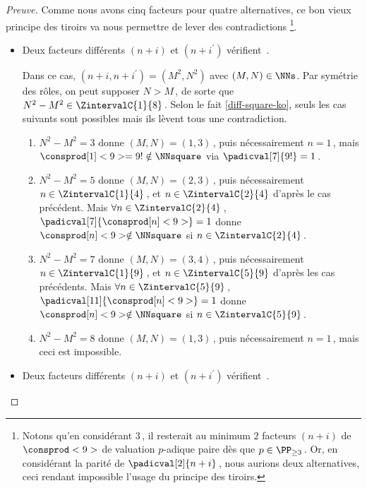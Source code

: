 \begin{proof}[Preuve]
    \medskip
    
    Comme nous avons cinq facteurs pour quatre alternatives, ce bon vieux principe des tiroirs va nous permettre de lever des contradictions
    \footnote{
    	Notons qu'en considérant $3$\,, il resterait au minimum $2$ facteurs $(n + i)$ de $\consprod<9>$ de valuation $p$-adique paire dès que $p \in \PP_{\geq 3}$\,. Or, en considérant la parité de $\padicval[2]{n + i}$\,, nous aurions deux alternatives, ceci rendant impossible l'usage du principe des tiroirs.
    }.
    \begin{itemize}
    	\medskip
		\item Deux facteurs différents $(n+i)$ et $(n+i^\prime)$ vérifient \,.
		
		\smallskip
		\noindent
		Dans ce cas, $(n+i, n+i^\prime) = (M^2, N^2)$ avec $(M, N) \in \NNs$.
		Par symétrie des rôles, on peut supposer $N > M$\,, de sorte que $N^2 - M^2 \in \ZintervalC{1}{8}$\,. 
		Selon le fait \ref{diff-square-ko}, seuls les cas suivants sont possibles mais ils lèvent tous une contradiction.
		\begin{enumerate}
			\item $N^2 - M^2 = 3$ donne $(M, N) = (1, 3)$\,, puis nécessairement $n = 1$\,, mais $\consprod[1]<9> = 9 ! \notin \NNsquare$ via $\padicval[7]{9!} = 1$\,.


			\item $N^2 - M^2 = 5$ donne $(M, N) = (2, 3)$\,, puis nécessairement $n \in \ZintervalC{1}{4}$\,, et $n \in \ZintervalC{2}{4}$ d'après le cas précédent.
			Mais $\forall n \in \ZintervalC{2}{4}$\,, $\padicval[7]{\consprod[n]<9>} = 1$ donne $\consprod[n]<9> \notin \NNsquare$ si $n \in \ZintervalC{2}{4}$\,.
			

			\item $N^2 - M^2 = 7$ donne $(M, N) = (3, 4)$\,, puis nécessairement $n \in \ZintervalC{1}{9}$\,, et $n \in \ZintervalC{5}{9}$ d'après les cas précédents.
			Mais $\forall n \in \ZintervalC{5}{9}$\,, $\padicval[11]{\consprod[n]<9>} = 1$ donne $\consprod[n]<9> \notin \NNsquare$ si $n \in \ZintervalC{5}{9}$\,.


			\item $N^2 - M^2 = 8$ donne $(M, N) = (1, 3)$\,, puis nécessairement $n = 1$\,, mais ceci est impossible.
		\end{enumerate}


    	\medskip
		\item Deux facteurs différents $(n+i)$ et $(n+i^\prime)$ vérifient \,.
		

\end{itemize}
\end{proof}
